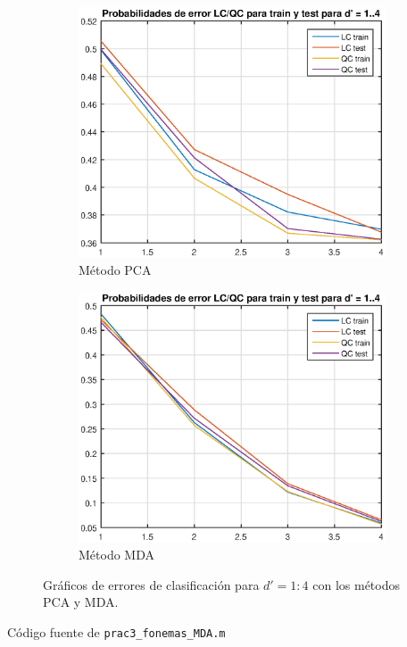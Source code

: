 \documentclass[11pt]{article} %
\begin{document}
\begin{figure}[h]
	\centering
	\begin{subfigure}[b]{\textwidth}
		\includegraphics[width=\textwidth]{../22_mda/prob_error_pca_1_4.eps}
		\caption[]{\small Método PCA}
		\label{fig:mda:dmax:pca}
	\end{subfigure}

	\begin{subfigure}[b]{\textwidth}
		\includegraphics[width=\textwidth]{../22_mda/prob_error_mda.eps}
		\caption[]{\small Método MDA}
		\label{fig:mda:dmax:mda}
	\end{subfigure}
	\caption{Gráficos de errores de clasificación para $d'=1:4$ con los métodos PCA y MDA.}
	\label{fig:mda:dmax}
\end{figure}

\clearpage

Código fuente de \texttt{prac3\_fonemas\_MDA.m}


\end{document}
